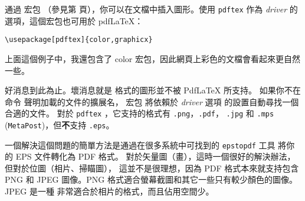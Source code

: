通過  宏包
（參見第 \pageref{eps} 頁），你可以在文檔中插入圖形。使用 \texttt{pdftex} 
作為 \emph{driver} 的選項，這個宏包也可用於 pdf\LaTeX{}：
\begin{code}
\begin{verbatim}
\usepackage[pdftex]{color,graphicx}
\end{verbatim}
\end{code}
上面這個例子中，我還包含了 color 宏包，因此網頁上彩色的文檔會看起來更自然一些。


好消息到此為止。壞消息就是 \EPSi{} 格式的圖形並不被 Pdf\LaTeX{} 所支持。
如果你不在命令  聲明加載的文件的擴展名，
宏包  將依賴於 \emph{driver} 選項
的設置自動尋找一個合適的文件。
對於 \texttt{pdftex} ，它支持的格式有 \texttt{.png}，\texttt{.pdf}，
\texttt{.jpg} 和 \texttt{.mps} (\texttt{MetaPost})，但{\textbf
不}支持 \texttt{.eps}。


一個解決這個問題的簡單方法是通過在很多系統中可找到的 \texttt{epstopdf} 工具
將你的 EPS 文件轉化為 PDF 格式。
對於矢量圖（畫），這時一個很好的解決辦法，但對於位圖（相片、掃瞄圖），
這並不是很理想，因為 PDF 格式本來就支持包含 PNG 和 JPEG 圖像。PNG 格式適合螢幕截圖和其它一些只有較少顏色的圖像。JPEG 是一種
非常適合於相片的格式，而且佔用空間少。


